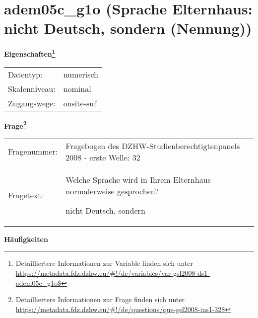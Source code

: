 
    \setcounter{footnote}{0}

    \vspace*{-1.8cm}
	\section{adem05c\_g1o (Sprache Elternhaus: nicht Deutsch, sondern (Nennung))}
	\label{section:adem05c_g1o}



    \vspace*{0.5cm}
    \noindent\textbf{Eigenschaften\footnote{Detailliertere Informationen zur Variable finden sich unter
		\url{https://metadata.fdz.dzhw.eu/\#!/de/variables/var-gsl2008-ds1-adem05c_g1o$}}}\\
	\begin{tabularx}{\hsize}{@{}lX}
	Datentyp: & numerisch \\
	Skalenniveau: & nominal \\
	Zugangswege: &
	  onsite-suf
 \\
    \end{tabularx}



				\vspace*{0.5cm}
                \noindent\textbf{Frage\footnote{Detailliertere Informationen zur Frage finden sich unter
		              \url{https://metadata.fdz.dzhw.eu/\#!/de/questions/que-gsl2008-ins1-32$}}}\\
				\begin{tabularx}{\hsize}{@{}lX}
					Fragenummer: &
					  Fragebogen des DZHW-Studienberechtigtenpanels 2008 - erste Welle:
					  32
 \\
					Fragetext: & Welche Sprache wird in Ihrem Elternhaus normalerweise gesprochen?\par  nicht Deutsch, sondern \\
				\end{tabularx}





        		\vspace*{0.5cm}
                \noindent\textbf{Häufigkeiten}

